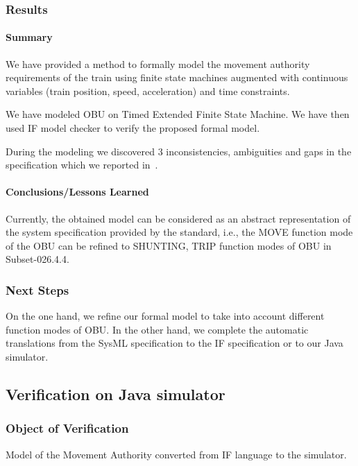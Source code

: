 \documentclass{template/openetcs_article}
\begin{document}
\subsubsection{Results}



\paragraph{Summary}

We have provided a method to formally model the
movement authority requirements of the train using
finite state machines augmented with continuous variables (train position, speed, acceleration) and
time constraints. 

We have modeled OBU on Timed Extended Finite State Machine.
We have then used IF model checker to verify the
proposed formal model. 

During the modeling we discovered 3 inconsistencies, ambiguities and gaps in the specification
which we reported in~\cite{specfindingsTSP}.

\paragraph{Conclusions/Lessons Learned}

Currently, the obtained model can be considered as an abstract representation
of the system specification provided by the standard, i.e., the MOVE
function mode of the OBU can be refined to SHUNTING, TRIP function modes of
OBU in Subset-026.4.4.


\subsubsection{Next Steps}

On the one hand, we refine our formal model to take into account different
function modes of OBU.
In the other hand, we complete the automatic translations from the SysML
specification to the IF specification or to our Java simulator.

\subsection{Verification on Java simulator}

\subsubsection{Object of Verification}
Model of the Movement Authority converted from IF language to the simulator.
\end{document}
